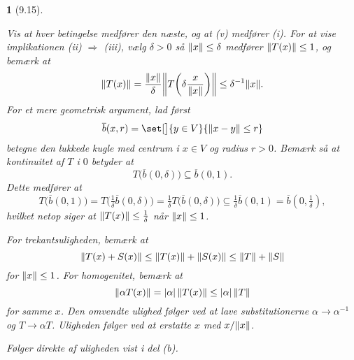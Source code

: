\documentclass[a4paper, 11pt, article, danish, oneside]{memoir}
\newcommand{\blank}{\mathrel{\;\cdot\;}}
\newcommand{\blankifempty}[1]{\ifstrempty{#1}{\blank}{#1}}
\DeclarePairedDelimiter{\auxdelimlvert}{\lvert}{\rvert}
\DeclarePairedDelimiter{\auxdelimlVert}{\lVert}{\rVert}
\newcommand{\abs}[2][]{\auxdelimlvert[#1]{\blankifempty{#2}}}
\newcommand{\norm}[2][]{\auxdelimlVert[#1]{\blankifempty{#2}}}
\newcommand\inv{^{-1}}
\newcommand{\pencilsymbol}{\raisebox{-2pt}{\normalfont\PencilLeft}}
\theoremstyle{changedotcustomnumber}
\theoremstyle{changedotbreakcustomnumber}
\newtheorem{opgavebreak}{\pencilsymbol}
\begin{document}
\begin{opgavebreak}[9.15]
\begin{solutionsec}
    \item Vis at hver betingelse medfører den næste, og at (v) medfører (i). For at vise implikationen (ii) $\Rightarrow$ (iii), vælg $\delta > 0$ så $\norm{x} \leq \delta$ medfører $\norm{T(x)} \leq 1$, og bemærk at
    \begin{equation*}
		\norm{T(x)}
			= \frac{\norm{x}}{\delta} \norm[\bigg]{T \biggl( \delta \frac{x}{\norm{x}} \biggr) }
			\leq \delta\inv \norm{x}.
	\end{equation*}
    For et mere geometrisk argument, lad først
    \begin{equation*}
        \overline{b}(x,r)
            = \set[\big]{y \in V}{\norm{x-y} \leq r}
    \end{equation*}
    betegne den \emph{lukkede} kugle med centrum i $x \in V$ og radius $r > 0$. Bemærk så at kontinuitet af $T$ i $0$ betyder at
    \begin{equation*}
        T\bigl( \overline{b}(0,\delta) \bigr)
            \subseteq \overline{b}(0,1).
    \end{equation*}
    Dette medfører at
    \begin{equation*}
        T\bigl( \overline{b}(0,1) \bigr)
            = T\bigl( \tfrac{1}{\delta} \overline{b}(0,\delta) \bigr)
            = \tfrac{1}{\delta} T\bigl( \overline{b}(0,\delta) \bigr)
            \subseteq \tfrac{1}{\delta} \overline{b}(0,1)
            = \overline{b}(0,\tfrac{1}{\delta}),
    \end{equation*}
    hvilket netop siger at $\norm{T(x)} \leq \tfrac{1}{\delta}$ når $\norm{x} \leq 1$.

    \item For trekantsuligheden, bemærk at
    \begin{equation*}
        \norm{T(x) + S(x)}
            \leq \norm{T(x)} + \norm{S(x)}
            \leq \norm{T} + \norm{S}
    \end{equation*}
    for $\norm{x} \leq 1$. For homogenitet, bemærk at
    \begin{equation*}
        \norm{\alpha T(x)}
            = \abs{\alpha} \, \norm{T(x)}
            \leq \abs{\alpha} \, \norm{T}
    \end{equation*}
    for samme $x$. Den omvendte ulighed følger ved at lave substitutionerne $\alpha \to \alpha\inv$ og $T \to \alpha T$. Uligheden følger ved at erstatte $x$ med $x/\norm{x}$.

    \item Følger direkte af uligheden vist i del (b).
\end{solutionsec}
\end{opgavebreak}
\end{document}
